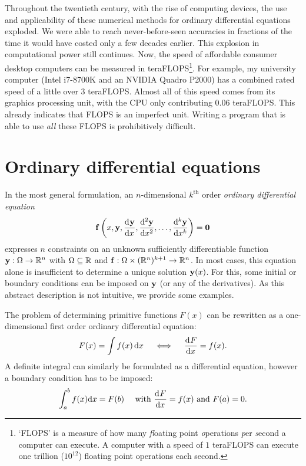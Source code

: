 Throughout the twentieth century, with the rise of computing devices, the use and applicability of these numerical methods for ordinary differential equations exploded. We were able to reach never-before-seen accuracies in fractions of the time it would have costed only a few decades earlier. This explosion in computational power still continues. Now, the speed of affordable consumer desktop computers can be measured in teraFLOPS\footnote{`FLOPS' is a measure of how many \emph{fl}oating point \emph{o}perations \emph{p}er \emph{s}econd a computer can execute. A computer with a speed of $1$ teraFLOPS can execute one trillion ($10^{12}$) floating point operations each second.}. For example, my university computer (Intel i7-8700K and an NVIDIA Quadro P2000) has a combined rated speed of a little over 3 teraFLOPS. Almost all of this speed comes from its graphics processing unit, with the CPU only contributing $0.06$ teraFLOPS. This already indicates that FLOPS is an imperfect unit. Writing a program that is able to use \emph{all} these FLOPS is prohibitively difficult.

\section{Ordinary differential equations}

In the most general formulation, an $n$-dimensional $k^\text{th}$ order \emph{ordinary differential equation}
\begin{equation}\label{equ:c1_ode_def}
    \vb{f}\left(x, \vb{y}, {\dv[]{\vb{y}}{x}}, {\dv[2]{\vb{y}}{x}}, \dots, {\dv[k]{\vb{y}}{x}}\right) = \vb{0}
\end{equation}
expresses $n$ constraints on an unknown sufficiently differentiable function $\vb{y} : \Omega \to \mathbb{R}^n$ with $\Omega \subseteq \mathbb{R}$ and $\vb{f}: \Omega \times (\mathbb{R}^n)^{k+1} \to \mathbb{R}^n$. In most cases, this equation alone is insufficient to determine a unique solution $\vb{y}(x)$. For this, some initial or boundary conditions can be imposed on $\vb{y}$ (or any of the derivatives). As this abstract description is not intuitive, we provide some examples.

The problem of determining primitive functions $F(x)$ can be rewritten as a one-dimensional first order ordinary differential equation:
$$
    F(x) = \int f(x) \,\dd x \quad \iff \quad \dv[]{F}{x} = f(x)\text{.}
$$
A definite integral can similarly be formulated as a differential equation, however a boundary condition has to be imposed:
$$
    \int_a^b f(x) \dd x = F(b) \quad \text{ with } \dv[]{F}{x} = f(x) \text{ and } F(a) = 0\text{.}
$$

